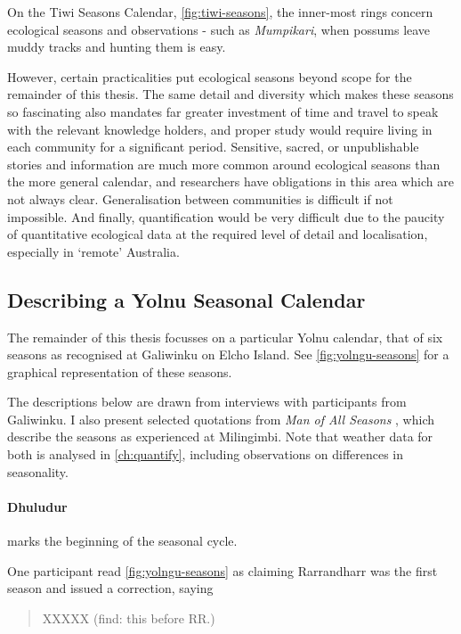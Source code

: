 On the Tiwi Seasons Calendar, \autoref{fig:tiwi-seasons}, the inner-most
rings concern ecological seasons and observations - such as
\textit{Mumpikari}, when possums leave muddy tracks and hunting them is easy.

However, certain practicalities put ecological seasons beyond scope
for the remainder of this thesis.
%
The same detail and diversity which makes these seasons so fascinating
also mandates far greater investment of time and travel to speak
with the relevant knowledge holders, and proper study would require
living in each community for a significant period.
%
Sensitive, sacred, or unpublishable stories and information are much more
common around ecological seasons than the more general calendar,
and researchers have obligations in this area which are not always clear.
%
Generalisation between communities is difficult if not impossible.
%
And finally, quantification would be very difficult due to the paucity
of quantitative ecological data at the required level of detail
and localisation, especially in `remote' Australia.





\subsection{Describing a Yolnu Seasonal Calendar}

The remainder of this thesis focusses on a particular Yolnu calendar,
that of six seasons as recognised at Galiwinku on Elcho Island.
See \autoref{fig:yolngu-seasons} for a graphical representation of these seasons.

The descriptions below are drawn from interviews with participants from Galiwinku.
I also present selected quotations from \textit{Man of All Seasons} \citep{davis1989},
which describe the seasons as experienced at Milingimbi.
Note that weather data for both is analysed in \autoref{ch:quantify},
including observations on differences in seasonality.


\paragraph{Dhuludur} marks the beginning of the seasonal cycle.

One participant read \autoref{fig:yolngu-seasons} as claiming Rarrandharr was the first season
and issued a correction, saying \blockquote{XXXXX (find: this before RR.)}.

